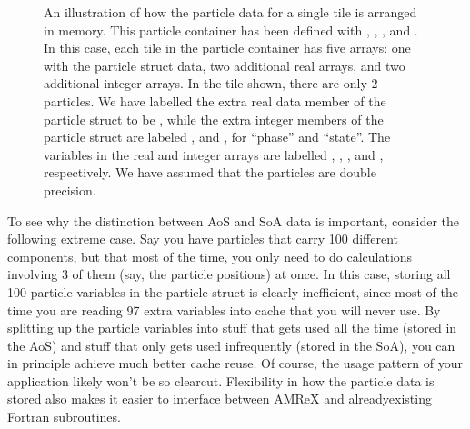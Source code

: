 \documentclass[letterpaper,10pt,english]{sphinxmanual}
\begin{document}
\begin{center}

\begin{figure}[htbp]
\centering
\capstart

\noindent{}
\caption{An illustration of how the particle data for a single tile is arranged in
memory. This particle container has been defined with , , , and .
In this case, each tile in the particle container has five arrays: one with
the particle struct data, two additional real arrays, and two additional
integer arrays.  In the tile shown, there are only 2 particles. We have
labelled the extra real data member of the particle struct to be
, while the extra integer members of the particle struct are
labeled , and , for “phase” and “state”. The variables in
the real and integer arrays are labelled , , ,
and , respectively. We have assumed that the particles are double
precision.}\label{\detokenize{Particle:id7}}\label{\detokenize{Particle:fig-particles-particle-arrays}}\end{figure}

\end{center}

\sphinxAtStartPar
To see why the distinction between AoS and SoA data is important, consider the
following extreme case. Say you have particles that carry 100 different
components, but that most of the time, you only need to do calculations
involving 3 of them (say, the particle positions) at once. In this case,
storing all 100 particle variables in the particle struct is clearly
inefficient, since most of the time you are reading 97 extra variables into
cache that you will never use. By splitting up the particle variables into
stuff that gets used all the time (stored in the AoS) and stuff that only gets
used infrequently (stored in the SoA), you can in principle achieve much better
cache reuse. Of course, the usage pattern of your application likely won’t be
so clear\sphinxhyphen{}cut. Flexibility in how the particle data is stored also makes it
easier to interface between AMReX and already\sphinxhyphen{}existing Fortran subroutines.
\end{document}
